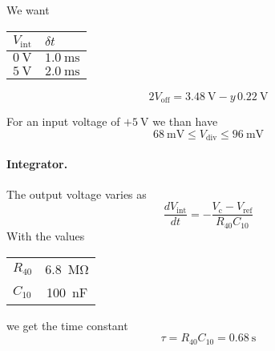 \documentclass[a4paper]{article}
\begin{document}
We want
\begin{center}
  \begin{tabular}{ll}
    \toprule
    $V_{\text{int}}$ & $\delta t$ \\
    \midrule
    $\SI{0}{\volt}$ & $\SI{1.0}{\milli\second}$ \\
    $\SI{5}{\volt}$ & $\SI{2.0}{\milli\second}$ \\
    \bottomrule
  \end{tabular}
\end{center}


\begin{equation*}
  2 V_{\text{off}} = \SI{3.48}{\volt} - y \, \SI{0.22}{\volt}
\end{equation*}


For an input voltage of $+\SI{5}{\volt}$ we than have
\begin{equation}
  \SI{68}{\milli\volt} \le V_{\text{div}} \le \SI{96}{\milli\volt}
\end{equation}


\paragraph{Integrator.}

\begin{center}
\end{center}
The output voltage varies as
\begin{equation}
  \frac{dV_{\text{int}}}{dt} = -\frac{V_{\text{c}} - V_{\text{ref}}}{R_{40} C_{10}}
\end{equation}
With the values
\begin{center}
  \begin{tabular}{lS}
    \toprule
    $R_{40}$ & \SI{6.8}{\mega\ohm} \\
    $C_{10}$ & \SI{100}{\nano\farad} \\
    \bottomrule
  \end{tabular}
\end{center}
we get the time constant
\begin{equation}
  \tau = R_{40}C_{10} = \SI{0.68}{\second}
\end{equation}
\end{document}

